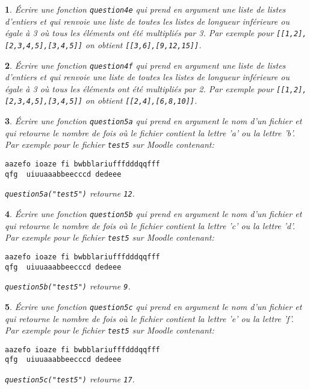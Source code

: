 \documentclass[10pt]{article}
\newtheorem{exi}{}
\newenvironment{exo}{\begin{exi}\em}{\end{exi}}
\begin{document}
\vspace*{-2ex}
\begin{exo}
    Écrire une fonction {\tt question4e} qui prend en argument une liste de listes d'entiers et qui renvoie une liste de toutes les listes
de longueur inférieure ou égale à 3 où tous les éléments ont été multipliés par 3. Par exemple pour \verb+[[1,2],[2,3,4,5],[3,4,5]]+ on obtient \verb+[[3,6],[9,12,15]]+.
\end{exo}
\vspace*{-2ex}
\begin{exo}
    Écrire une fonction {\tt question4f} qui prend en argument une liste de listes d'entiers et qui renvoie une liste de toutes les listes
de longueur inférieure ou égale à 3 où tous les éléments ont été multipliés par 2. Par exemple pour \verb+[[1,2],[2,3,4,5],[3,4,5]]+ on obtient \verb+[[2,4],[6,8,10]]+.
\end{exo}
\vspace*{-2ex}
\begin{exo}
    Écrire une fonction {\tt question5a} qui prend en argument le nom d'un fichier et qui retourne le nombre de fois où le fichier contient la lettre 'a' ou la
lettre 'b'.
Par exemple pour le fichier \verb+test5+ sur Moodle contenant: 
\begin{verbatim} 
aazefo ioaze fi bwbblariufffdddqqfff
qfg  uiuuaaabbeecccd dedeee
\end{verbatim} 
\verb+question5a("test5")+ retourne \verb+12+.
\end{exo}
\vspace*{-2ex}
\begin{exo}
    Écrire une fonction {\tt question5b} qui prend en argument le nom d'un fichier et qui retourne le nombre de fois où le fichier contient la lettre 'c' ou la
lettre 'd'.
Par exemple pour le fichier \verb+test5+ sur Moodle contenant: 
\begin{verbatim} 
aazefo ioaze fi bwbblariufffdddqqfff
qfg  uiuuaaabbeecccd dedeee
\end{verbatim} 
\verb+question5b("test5")+ retourne \verb+9+.
\end{exo}
\vspace*{-2ex}
\begin{exo}
    Écrire une fonction {\tt question5c} qui prend en argument le nom d'un fichier et qui retourne le nombre de fois où le fichier contient la lettre 'e' ou la
lettre 'f'.
Par exemple pour le fichier \verb+test5+ sur Moodle contenant: 
\begin{verbatim} 
aazefo ioaze fi bwbblariufffdddqqfff
qfg  uiuuaaabbeecccd dedeee
\end{verbatim} 
\verb+question5c("test5")+ retourne \verb+17+.
\end{exo}
\end{document}
